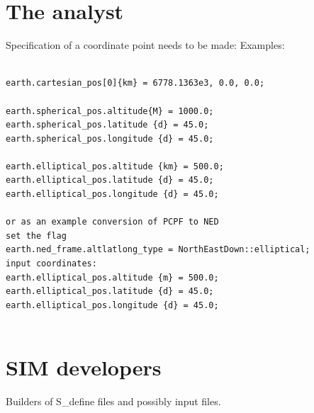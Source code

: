 \documentclass[twoside,11pt,titlepage]{report}
\begin{document}
\section { The analyst}
Specification of a coordinate point needs to be made:
Examples:
\begin{verbatim}

earth.cartesian_pos[0]{km} = 6778.1363e3, 0.0, 0.0;

earth.spherical_pos.altitude{M} = 1000.0;
earth.spherical_pos.latitude {d} = 45.0;
earth.spherical_pos.longitude {d} = 45.0;

earth.elliptical_pos.altitude {km} = 500.0;
earth.elliptical_pos.latitude {d} = 45.0;
earth.elliptical_pos.longitude {d} = 45.0;

or as an example conversion of PCPF to NED
set the flag
earth.ned_frame.altlatlong_type = NorthEastDown::elliptical;
input coordinates:
earth.elliptical_pos.altitude {m} = 500.0;
earth.elliptical_pos.latitude {d} = 45.0;
earth.elliptical_pos.longitude {d} = 45.0;


\end{verbatim}


\section{ SIM developers}
Builders of S\_define files and possibly input files.
\end{document}
